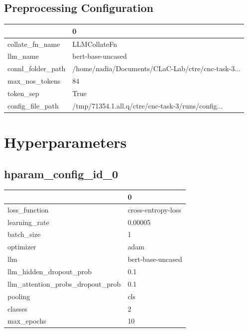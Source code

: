 \documentclass{article}
\begin{document}
\subsection{Preprocessing Configuration}
\begin{tabular}{ll}
\toprule
{} &                                                  0 \\
\midrule
collate\_fn\_name   &                                       LLMCollateFn \\
llm\_name          &                                  bert-base-uncased \\
connl\_folder\_path &  /home/nadia/Documents/CLaC-Lab/ctre/cnc-task-3... \\
max\_nos\_tokens    &                                                 84 \\
token\_sep         &                                               True \\
config\_file\_path  &  /tmp/71354.1.all.q/ctre/cnc-task-3/runs/config... \\
\bottomrule
\end{tabular}

\section{Hyperparameters}
\subsection{hparam\_config\_id\_0}
\begin{tabular}{ll}
\toprule
{} &                   0 \\
\midrule
loss\_function                    &  cross-entropy-loss \\
learning\_rate                    &             0.00005 \\
batch\_size                       &                   1 \\
optimizer                        &                adam \\
llm                              &   bert-base-uncased \\
llm\_hidden\_dropout\_prob          &                 0.1 \\
llm\_attention\_probs\_dropout\_prob &                 0.1 \\
pooling                          &                 cls \\
classes                          &                   2 \\
max\_epochs                       &                  10 \\
\bottomrule
\end{tabular}
\end{document}
